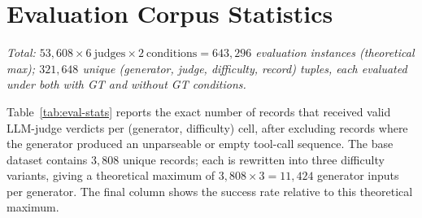\section{Evaluation Corpus Statistics}
\label{app:eval-stats}

\begin{table}[h!]
\centering
\small
\setlength{\tabcolsep}{8pt}
\renewcommand{\arraystretch}{1.2}
{\small\textit{Total: $53{,}608 \times 6\ \mathrm{judges} \times 2\ \mathrm{conditions} = 643{,}296$ evaluation instances (theoretical max); $321{,}648$ unique (generator, judge, difficulty, record) tuples, each evaluated under both with GT and without GT conditions.}}
\caption{Number of records with valid LLM-judge verdicts per generator and difficulty tier. \emph{Theoretical max} per generator is $3{,}808 \times 3 = 11{,}424$ (three difficulty variants of each base record). Judged records are identical across all six LLM judges for a given (generator, difficulty) cell. Multiplying the \emph{Total} column by $6$~judges~$\times~2$~conditions yields the full evaluation instance count per generator.}
\label{tab:eval-stats}

\end{table}

Table~\ref{tab:eval-stats} reports the exact number of records that received valid LLM-judge verdicts per (generator, difficulty) cell, after excluding records where the generator produced an unparseable or empty tool-call sequence. The base dataset contains $3{,}808$ unique records; each is rewritten into three difficulty variants, giving a theoretical maximum of $3{,}808 \times 3 = 11{,}424$ generator inputs per generator. The final column shows the success rate relative to this theoretical maximum.


